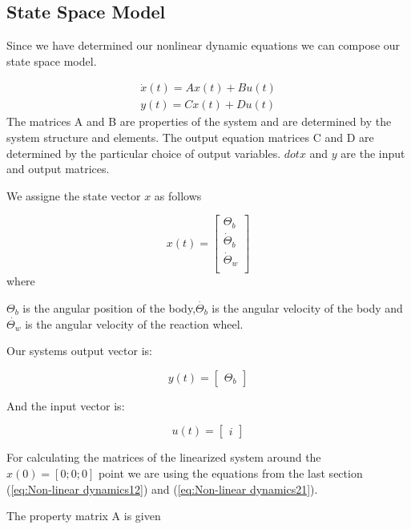 \subsection{State Space Model}


Since we have determined our nonlinear dynamic equations we can compose our state space model.



\begin{align*}
	\dot{x}(t) = Ax(t) + Bu(t)\\
	{y}(t) = Cx(t) + Du(t)
\end{align*}
The matrices A and B are properties of the system and are determined by the system structure and elements.
The output equation matrices C and D are determined by the particular choice of output variables\cite{state1}.
$dot{x}$ and $y$ are the input and output matrices.

We assigne the state vector $x$ as follows	

\[ x(t) =  \left[ \begin{array}{ccc}
\Theta_{b}  \\
\dot \Theta_{b}  \\
\dot \Theta_{w} \\\end{array} \right]\] 
where

$\Theta_{b}$ is the angular position of the body,$\dot{ \Theta_{b}}$ is the angular velocity of the body and $\dot{\Theta_{w}}$ is the angular velocity of the reaction wheel.


Our systems output vector is:

\[ y(t) =  \left[ \begin{array}{ccc}
\Theta_{b}  \end{array} \right]\] 

And the input vector is:

\[ u(t) =  \left[ \begin{array}{ccc}
i  \end{array} \right]\] 



For calculating the matrices of the linearized system around the  $x(0) = [0;0;0]$ point we are using the equations from the last section (\ref{eq:Non-linear dynamics12}) and (\ref{eq:Non-linear dynamics21}).

The property matrix A is given\cite{state1}


